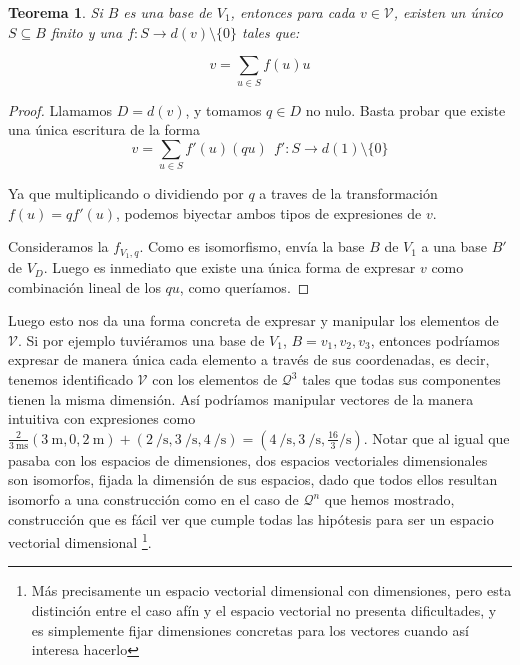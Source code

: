 \documentclass{article}
\def\Quantities{\mathcal Q}
\newtheorem{teorema}{{\sc Teorema}}
\begin{document}
\begin{teorema}
Si $B$ es una base de $V_1$, entonces para cada $v \in \mathcal{V}$, existen un único $S \subseteq B$ finito y una $f : S \rightarrow d(v) \setminus \{0\}$ tales que:

$$ v = \sum_{u \in S}{f(u) u} $$
\end{teorema}
\begin{proof}
Llamamos $D = d(v)$, y tomamos $q \in D$ no nulo. Basta probar que existe una única escritura de la forma
$$ v = \sum_{u \in S}{f'(u) (qu)} \ \ f' : S \rightarrow d(1) \setminus \{0\}$$

Ya que multiplicando o dividiendo por $q$ a traves de la transformación $f(u) = qf'(u)$,
podemos biyectar ambos tipos de expresiones de $v$.

Consideramos la $f_{V_1, q}$. Como es isomorfismo, envía la base $B$ de $V_1$ a una base $B'$ de $V_D$. Luego es inmediato que
existe una única forma de expresar $v$ como combinación lineal de los $qu$, como queríamos.
\end{proof}

Luego esto nos da una forma concreta de expresar y manipular los elementos de $\mathcal{V}$. Si por ejemplo tuviéramos una
base de $V_1$, $B = {v_1,v_2,v_3}$, entonces podríamos expresar de manera única cada elemento a través de sus coordenadas, es decir,
tenemos identificado $\mathcal{V}$ con los elementos de $\Quantities^3$ tales que todas sus componentes tienen la misma dimensión.
Así podríamos manipular vectores de la manera intuitiva con expresiones como
$\frac{2}{\SI{3}{\meter \second}}(\SI{3}{\meter},0,\SI{2}{\meter}) + 
  (\SI{2}{ \per \second },\SI{3}{ \per \second },\SI{4}{ \per \second }) = (\SI{4}{ \per \second },\SI{3}{ \per \second } ,\frac{16}{3}\si{ \per \second })$.
Notar que al igual que pasaba con los espacios de dimensiones, dos espacios vectoriales dimensionales son isomorfos, fijada la dimensión de sus espacios,
dado que todos ellos resultan isomorfo a una construcción como en el caso de $\Quantities^n$ que hemos mostrado, construcción que es
fácil ver que cumple todas las hipótesis para ser un espacio vectorial dimensional \footnote{Más precisamente un espacio vectorial dimensional con dimensiones, pero esta distinción entre el caso afín y el espacio vectorial no presenta dificultades, y es simplemente fijar dimensiones concretas para los vectores cuando así interesa hacerlo}.
\end{document}
